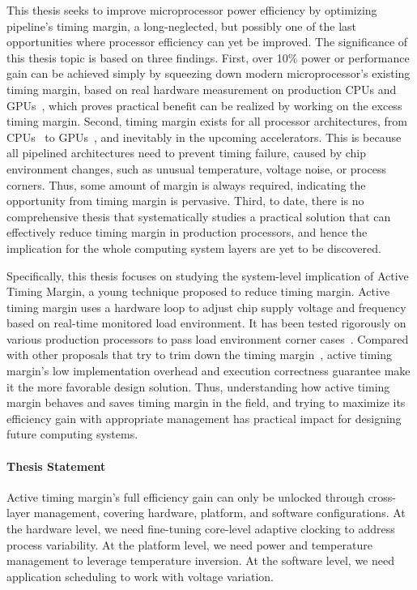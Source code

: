 This thesis seeks to improve microprocessor power efficiency by optimizing pipeline's timing margin, a long-neglected, but possibly one of the last opportunities where processor efficiency can yet be improved. The significance of this thesis topic is based on three findings. First, over 10\% power or performance gain can be achieved simply by squeezing down modern microprocessor's existing timing margin, based on real hardware measurement on production CPUs and GPUs~\cite{reddi2010voltage, leng2015safe}, which proves practical benefit can be realized by working on the excess timing margin. Second, timing margin exists for all processor architectures, from CPUs~\cite{reddi2009voltage,reddi2010voltage} to GPUs~\cite{leng2014gpuvolt, leng2015gpu, leng2015safe}, and inevitably in the upcoming accelerators. This is because all pipelined architectures need to prevent timing failure, caused by chip environment changes, such as unusual temperature, voltage noise, or process corners. Thus, some amount of margin is always required, indicating the opportunity from timing margin is pervasive. Third, to date, there is no comprehensive thesis that systematically studies a practical solution that can effectively reduce timing margin in production processors, and hence the implication for the whole computing system layers are yet to be discovered.

Specifically, this thesis focuses on studying the system-level implication of Active Timing Margin, a young technique proposed to reduce timing margin. Active timing margin uses a hardware loop to adjust chip supply voltage and frequency based on real-time monitored load environment. It has been tested rigorously on various production processors to pass load environment corner cases~\cite{lefurgy2011active,bowman201222nm,tokunaga20145,grenat20145,bowman20158,webel2015robust,vezyrtzis2018droop,fischer200590nm}. Compared with other proposals that try to trim down the timing margin~\cite{grochowski2002microarchitectural,ernst2003razor,powell2003pipeline,gupta2008decor,gupta2009event, reddi2009voltage, reddi2010voltage,miller2012vrsync,leng2015safe, papadimitriou2017harnessing}, active timing margin's low implementation overhead and execution correctness guarantee make it the more favorable design solution. Thus, understanding how active timing margin behaves and saves timing margin in the field, and trying to maximize its efficiency gain with appropriate management has practical impact for designing future computing systems.

\paragraph{Thesis Statement} Active timing margin’s full efficiency gain can only be unlocked through cross-layer management, covering hardware, platform, and software configurations. At the hardware level, we need fine-tuning core-level adaptive clocking to address process variability. At the platform level, we need power and temperature management to leverage temperature inversion. At the software level, we need application scheduling to work with voltage variation.

